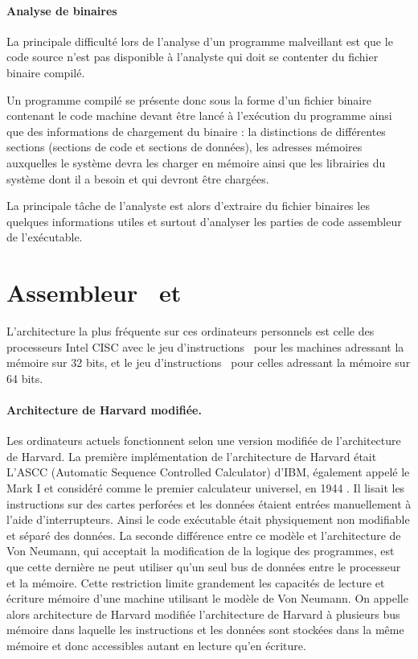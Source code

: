 \paragraph{Analyse de binaires}
La principale difficulté lors de l'analyse d'un programme malveillant est que le code source n'est pas disponible à l'analyste qui doit se contenter du fichier binaire compilé.

Un programme compilé se présente donc sous la forme d'un fichier binaire contenant le code machine devant être lancé à l'exécution du programme ainsi que des informations de chargement du binaire : la distinctions de différentes sections (sections de code et sections de données), les adresses mémoires auxquelles le système devra les charger en mémoire ainsi que les librairies du système dont il a besoin et qui devront être chargées.

La principale tâche de l'analyste est alors d'extraire du fichier binaires les quelques informations utiles et surtout d'analyser les parties de code assembleur de l'exécutable.

\section{Assembleur \xq\ et \xs}
L'architecture la plus fréquente sur ces ordinateurs personnels est celle des processeurs Intel CISC avec le jeu d'instructions \xq\ pour les machines adressant la mémoire sur 32 bits, et le jeu d'instructions \xs\ pour celles adressant la mémoire sur 64 bits.

\paragraph{Architecture de Harvard modifiée.}
Les ordinateurs actuels fonctionnent selon une version modifiée de l'architecture de Harvard.
La première implémentation de l'architecture de Harvard était L’ASCC (Automatic Sequence Controlled Calculator) d'IBM, également appelé le Mark I et considéré comme le premier calculateur universel, en 1944 . 
Il lisait les instructions sur des cartes perforées et les données étaient entrées manuellement à l'aide d'interrupteurs. 
Ainsi le code exécutable était physiquement non modifiable et séparé des données. 
La seconde différence entre ce modèle et l'architecture de Von Neumann, qui acceptait la modification de la logique des programmes, est que cette dernière ne peut utiliser qu'un seul bus de données entre le processeur et la mémoire. 
Cette restriction limite grandement les capacités de lecture et écriture mémoire d'une machine utilisant le modèle de Von Neumann. On appelle alors architecture de Harvard modifiée l'architecture de Harvard à plusieurs bus mémoire dans laquelle les instructions et les données sont stockées dans la même mémoire et donc accessibles autant en lecture qu'en écriture.

